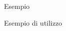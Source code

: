 \begin{frame}{Esempio}

    \begin{exampleblock}{Esempio di utilizzo}
	  \lstset{inputencoding=utf8/latin1}
      
    \end{exampleblock}

\end{frame}
